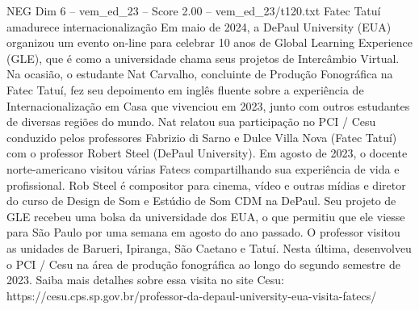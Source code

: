\begin{textsample}{NEG Dim 6 – vem\_ed\_23 – Score 2.00 – vem\_ed\_23/t120.txt}  \label{ex:f6_neg_034}
Fatec Tatuí amadurece internacionalização Em maio de 2024, a DePaul University (EUA) organizou um evento on-line para celebrar 10 anos de Global Learning Experience (GLE), que é como a universidade chama seus projetos de Intercâmbio Virtual.
Na ocasião, o estudante Nat Carvalho, concluinte de Produção Fonográfica na Fatec Tatuí, fez seu depoimento em inglês fluente sobre a experiência de Internacionalização em Casa que vivenciou em 2023, junto com outros estudantes de diversas regiões do mundo.
Nat relatou sua participação no PCI / Cesu conduzido pelos professores Fabrizio di Sarno e Dulce Villa Nova (Fatec Tatuí) com o professor Robert Steel (DePaul University).
Em agosto de 2023, o docente norte-americano visitou várias Fatecs compartilhando sua experiência de vida e profissional.
Rob Steel é compositor para cinema, vídeo e outras mídias e diretor do curso de Design de Som e Estúdio de Som CDM na DePaul.
Seu projeto de GLE recebeu uma bolsa da universidade dos EUA, o que permitiu que ele viesse para São Paulo por uma semana em agosto do ano passado.
O professor visitou as unidades de Barueri, Ipiranga, São Caetano e Tatuí.
Nesta última, desenvolveu o PCI / Cesu na área de produção fonográfica ao longo do segundo semestre de 2023.
Saiba mais detalhes sobre essa visita no site Cesu: https://cesu.cps.sp.gov.br/professor-da-depaul-university-eua-visita-fatecs/

\end{textsample}
